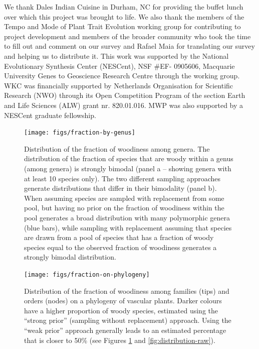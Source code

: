 \documentclass[12pt]{article}
\begin{document}
We thank Dales Indian Cuisine in Durham, NC for providing the buffet lunch over which this project was brought to life. We also thank the members of the Tempo and Mode of Plant Trait Evolution working group for contributing to project development and members of the broader community who took the time to fill out and comment on our survey and Rafael Maia for translating our survey and helping us to distribute it. This work was supported by the National Evolutionary Synthesis Center (NESCent), NSF \#EF- 0905606, Macquarie University Genes to Geoscience Research Centre through the working group. WKC was financially supported by Netherlands Organisation for Scientific Research (NWO) through its Open Competition Program of the section Earth and Life Sciences (ALW) grant nr. 820.01.016. MWP was also supported by a NESCent graduate fellowship.




\begin{figure}[p]
  \centering
  \texttt{[image: figs/fraction-by-genus]}
  \caption{Distribution of the fraction of woodiness among genera.
    The distribution of the fraction of species that are woody within
    a genus (among genera) is strongly bimodal (panel a -- showing
    genera with at least 10 species only).
    The two different sampling approaches generate distributions that
    differ in their bimodality (panel b). When assuming species are
    sampled with replacement from some pool, but having no prior on
    the fraction of woodiness within the pool generates a broad
    distribution with many polymorphic genera (blue bars), while
    sampling with replacement assuming that species are drawn from a
    pool of species that has a fraction of woody species equal to the
    observed fraction of woodiness generates a strongly bimodal
    distribution.}
  \label{fig:distribution-genera}
\end{figure}

\begin{figure}[p]
  \centering
  \texttt{[image: figs/fraction-on-phylogeny]}
  \caption{Distribution of the fraction of woodiness among families
    (tips) and orders (nodes) on a phylogeny of vascular plants.
    Darker colours have a higher proportion of woody species,
    estimated using the ``strong prior'' (sampling without
    replacement) approach. Using the ``weak prior'' approach
    generally leads to an estimated percentage that is closer to 50\% (see Figures
    \ref{fig:distribution-genera} and \ref{fig:distribution-raw}).}
\label{fig:phylogeny}
\end{figure}
\end{document}
